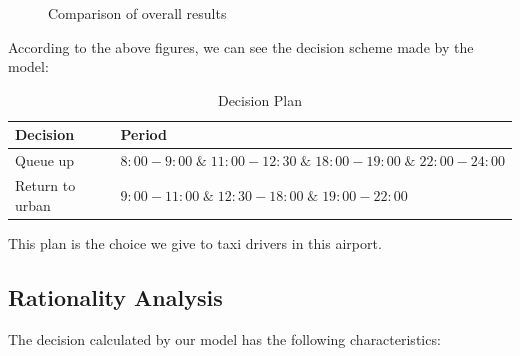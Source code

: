 \begin{figure}[H]
\centering  
{}
\caption{Comparison of overall results}
\label{Fig.q211}
\end{figure}
According to the above figures, we can see the decision scheme made by the model:
\begin{table}[H]
\centering
\caption{ Decision Plan}
\begin{tabularx}{15cm}{lX}  
\hline                      
Decision & Period   \\
\hline
Queue up  & $8:00-9:00 \;\&\; 11:00-12:30 \;\&\; 18:00-19:00 \;\&\; 22:00-24:00$\\
Return to urban & $9:00-11:00 \;\&\; 12:30-18:00 \;\&\; 19:00-22:00$\\
\hline
\end{tabularx}
\end{table}
This plan is the choice we give to taxi drivers in this airport.

\subsection{Rationality Analysis}
The decision calculated by our model has the following characteristics:

